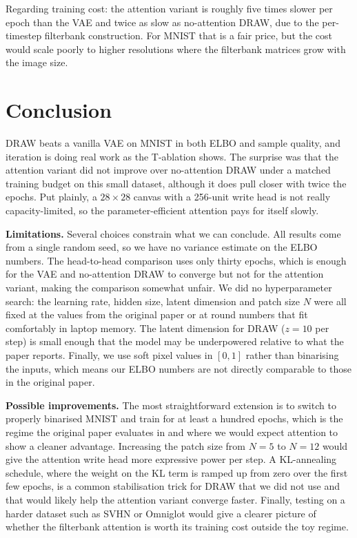 \documentclass{article}
\begin{document}
Regarding training cost: the attention variant is roughly five times slower per
epoch than the VAE and twice as slow as no-attention DRAW, due to the
per-timestep filterbank construction. For MNIST that is a fair price, but
the cost would scale poorly to higher resolutions where the filterbank
matrices grow with the image size.

\section{Conclusion}
\label{sec:conclusion}

DRAW beats a vanilla VAE on MNIST in both ELBO and sample quality, and
iteration is doing real work as the T-ablation shows. The surprise was that
the attention variant did not improve over no-attention DRAW under a
matched training budget on this small dataset, although it does pull closer
with twice the epochs. Put plainly, a \(28\times 28\) canvas with a
256-unit write head is not really capacity-limited, so the
parameter-efficient attention pays for itself slowly.

\textbf{Limitations.}
Several choices constrain what we can conclude. All results come from a
single random seed, so we have no variance estimate on the ELBO numbers.
The head-to-head comparison uses only thirty epochs, which is enough for
the VAE and no-attention DRAW to converge but not for the attention
variant, making the comparison somewhat unfair. We did no hyperparameter
search: the learning rate, hidden size, latent dimension and patch size
\(N\) were all fixed at the values from the original paper or at round
numbers that fit comfortably in laptop memory. The latent dimension for
DRAW (\(z=10\) per step) is small enough that the model may be
underpowered relative to what the paper reports. Finally, we use soft
pixel values in \([0,1]\) rather than binarising the inputs, which means
our ELBO numbers are not directly comparable to those in the original
paper.

\textbf{Possible improvements.}
The most straightforward extension is to switch to properly binarised
MNIST and train for at least a hundred epochs, which is the regime the
original paper evaluates in and where we would expect attention to show a
cleaner advantage. Increasing the patch size from \(N=5\) to \(N=12\)
would give the attention write head more expressive power per step.
A KL-annealing schedule, where the weight on the KL term is ramped up
from zero over the first few epochs, is a common stabilisation trick for
DRAW that we did not use and that would likely help the attention variant
converge faster. Finally, testing on a harder dataset such as SVHN or
Omniglot would give a clearer picture of whether the filterbank attention
is worth its training cost outside the toy regime.



\end{document}
